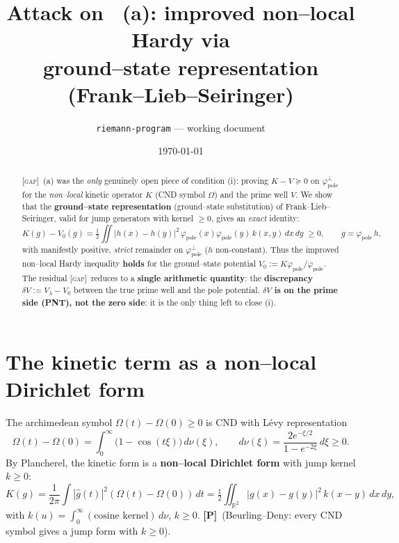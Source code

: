 \documentclass[11pt]{article}
\title{\textbf{Attack on \GAP\ (a): improved non--local Hardy via\\
ground--state representation (Frank--Lieb--Seiringer)}}
\author{\texttt{riemann-program} --- working document}
\date{\today}
\newcommand{\PR}{\textcolor{green!55!black}{\textbf{[P]}}}
\newcommand{\GAP}{\textcolor{red!75!black}{\textsc{[gap]}}}
\theoremstyle{plain}
\theoremstyle{definition}
\newcommand{\R}{\mathbb{R}}
\newcommand{\kin}{K}
\newcommand{\vv}{V}
\newcommand{\fp}{\varphi_{\mathrm{pole}}}
\begin{document}
\maketitle

\begin{abstract}
\GAP\ (a) was the \emph{only} genuinely open piece of condition (i): proving
$\kin-\vv\succeq0$ on $\fp^\perp$ for the \emph{non--local} kinetic operator $\kin$
(CND symbol $\Omega$) and the prime well $\vv$. We show that the
\textbf{ground--state representation} (ground--state substitution) of
Frank--Lieb--Seiringer, valid for jump generators with kernel $\ge0$, gives an
\emph{exact} identity:
\[
  \kin(g)-\vv_0(g)=\tfrac12\!\iint |h(x)-h(y)|^2\,\fp(x)\fp(y)\,k(x,y)\,dx\,dy\;\ge0,
  \qquad g=\fp\,h,
\]
with manifestly positive, \emph{strict} remainder on $\fp^\perp$ ($h$ non-constant). Thus
the improved non--local Hardy inequality \textbf{holds} for the ground--state potential
$\vv_0:=\kin\fp/\fp$. The residual \GAP\ reduces to a \textbf{single arithmetic quantity}:
the \textbf{discrepancy} $\delta\vv:=\vv_\lambda-\vv_0$ between the true prime well and the
pole potential. \textbf{$\delta\vv$ is on the prime side (PNT), not the zero side}: it is
the only thing left to close (i).
\end{abstract}

\tableofcontents

\section{The kinetic term as a non--local Dirichlet form}\label{sec:dirichlet}

The archimedean symbol $\Omega(t)-\Omega(0)\ge0$ is CND with Lévy representation
\[
  \Omega(t)-\Omega(0)=\int_0^\infty\!\bigl(1-\cos(t\xi)\bigr)\,d\nu(\xi),
  \qquad d\nu(\xi)=\frac{2e^{-\xi/2}}{1-e^{-2\xi}}\,d\xi\ge0 .
\]
By Plancherel, the kinetic form is a \textbf{non--local Dirichlet form} with jump
kernel $k\ge0$:
\begin{equation}\label{eq:Kdirichlet}
  \kin(g)=\frac1{2\pi}\!\int|\widehat g(t)|^2(\Omega(t)-\Omega(0))\,dt
  =\tfrac12\!\iint_{\R^2}|g(x)-g(y)|^2\,k(x-y)\,dx\,dy,
\end{equation}
with $k(u)=\int_0^\infty (\text{cosine kernel})\,d\nu$, $k\ge0$. \PR\ (Beurling--Deny:
every CND symbol gives a jump form with $k\ge0$).
\end{document}
